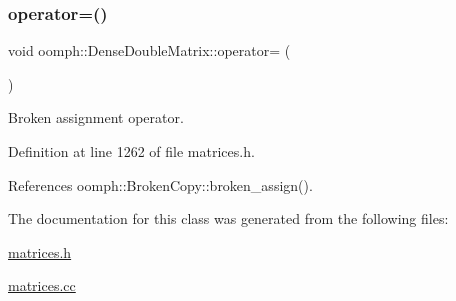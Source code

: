 \subsubsection{\texorpdfstring{operator=()}{operator=()}}
{\footnotesize\ttfamily void oomph\+::\+Dense\+Double\+Matrix\+::operator= (\begin{DoxyParamCaption}\item[{const \hyperlink{classoomph_1_1DenseDoubleMatrix}{Dense\+Double\+Matrix} \&}]{ }\end{DoxyParamCaption})\hspace{0.3cm}{\ttfamily [inline]}}



Broken assignment operator. 



Definition at line 1262 of file matrices.\+h.



References oomph\+::\+Broken\+Copy\+::broken\+\_\+assign().



The documentation for this class was generated from the following files\+:\begin{DoxyCompactItemize}
\item 
\hyperlink{matrices_8h}{matrices.\+h}\item 
\hyperlink{matrices_8cc}{matrices.\+cc}\end{DoxyCompactItemize}
